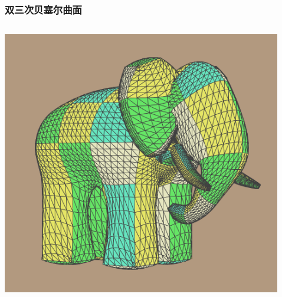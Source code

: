 \documentclass[14pt,notheorems,leqno,xcolor={rgb}]{beamer} %
\begin{document}
\begin{frame}
\frametitle{双三次贝塞尔曲面}
\begin{columns}[onlytextwidth]
\includegraphics[width=\textwidth]{Bicubic_Patches}
\par
\href{https://commons.wikimedia.org/wiki/File:Bicubic_Patches.png}{}
\par\vspace{1em}
\par
\href{https://commons.wikimedia.org/wiki/User:Philiprideout}{}
\end{columns}
\end{frame}
\end{document}
